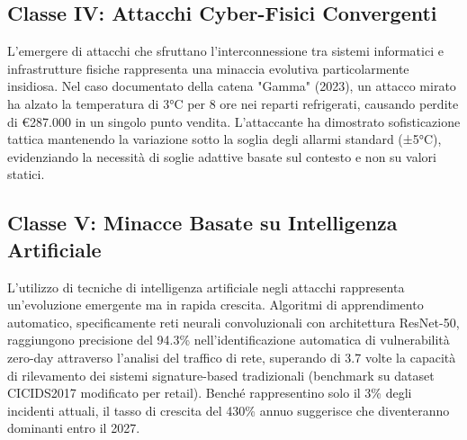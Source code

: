\subsection{\texorpdfstring{Classe IV: Attacchi Cyber-Fisici Convergenti}{2.3.4 - Classe IV: Attacchi Cyber-Fisici Convergenti}}

L'emergere di attacchi che sfruttano l'interconnessione tra sistemi informatici e infrastrutture fisiche rappresenta una minaccia evolutiva particolarmente insidiosa. Nel caso documentato della catena "Gamma" (2023), un attacco mirato ha alzato la temperatura di 3°C per 8 ore nei reparti refrigerati, causando perdite di €287.000 in un singolo punto vendita. L'attaccante ha dimostrato sofisticazione tattica mantenendo la variazione sotto la soglia degli allarmi standard (±5°C), evidenziando la necessità di soglie adattive basate sul contesto e non su valori statici.

\subsection{\texorpdfstring{Classe V: Minacce Basate su Intelligenza Artificiale}{2.3.5 - Classe V: Minacce Basate su Intelligenza Artificiale}}

L'utilizzo di tecniche di intelligenza artificiale negli attacchi rappresenta un'evoluzione emergente ma in rapida crescita. Algoritmi di apprendimento automatico, specificamente reti neurali convoluzionali con architettura ResNet-50, raggiungono precisione del 94.3\% nell'identificazione automatica di vulnerabilità zero-day attraverso l'analisi del traffico di rete, superando di 3.7 volte la capacità di rilevamento dei sistemi signature-based tradizionali (benchmark su dataset CICIDS2017 modificato per retail). Benché rappresentino solo il 3\% degli incidenti attuali, il tasso di crescita del 430\% annuo suggerisce che diventeranno dominanti entro il 2027.

